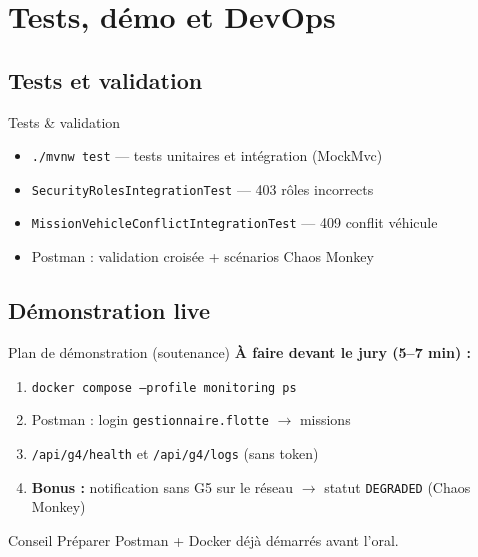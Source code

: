 \documentclass[aspectratio=169,xcolor=table]{beamer}
\begin{document}
\section{Tests, démo et DevOps}

\subsection{Tests et validation}

\begin{frame}{Tests \& validation}
  \begin{itemize}
    \item \texttt{./mvnw test} — tests unitaires et intégration (MockMvc)
    \item \texttt{SecurityRolesIntegrationTest} — 403 rôles incorrects
    \item \texttt{MissionVehicleConflictIntegrationTest} — 409 conflit véhicule
    \item Postman : validation croisée + scénarios Chaos Monkey
  \end{itemize}
\end{frame}

\subsection{Démonstration live}

\begin{frame}{Plan de démonstration (soutenance)}
  \textbf{À faire devant le jury (5--7 min) :}
  \begin{enumerate}
    \item \texttt{docker compose --profile monitoring ps}
    \item Postman : login \texttt{gestionnaire.flotte} $\rightarrow$ missions
    \item \texttt{/api/g4/health} et \texttt{/api/g4/logs} (sans token)
    \item \textbf{Bonus :} notification sans G5 sur le réseau $\rightarrow$ statut \texttt{DEGRADED} (Chaos Monkey)
  \end{enumerate}
  \vspace{0.2cm}
  \begin{alertblock}{Conseil}
    Préparer Postman + Docker déjà démarrés avant l'oral.
  \end{alertblock}
\end{frame}
\end{document}
